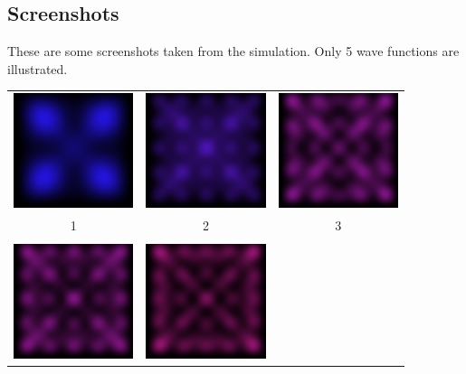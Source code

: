 \documentclass[a4paper, 10pt]{article}
\begin{document}
    \subsection{Screenshots}
    These are some screenshots taken from the simulation. Only 5 wave functions are illustrated.\\
    \begin{table}[ht]
        \begin{center}
        \begin{tabular}{c c c}
            \includegraphics[width=3.5cm]{graphics/result1.png} &
            \includegraphics[width=3.5cm]{graphics/result3.png} &
            \includegraphics[width=3.5cm]{graphics/result2.png} \\
            1 & 2 & 3 \\\\
            \includegraphics[width=3.5cm]{graphics/result6.png} &
            \includegraphics[width=3.5cm]{graphics/result4.png} &

\end{tabular}
\end{center}
\end{table}
\end{document}
